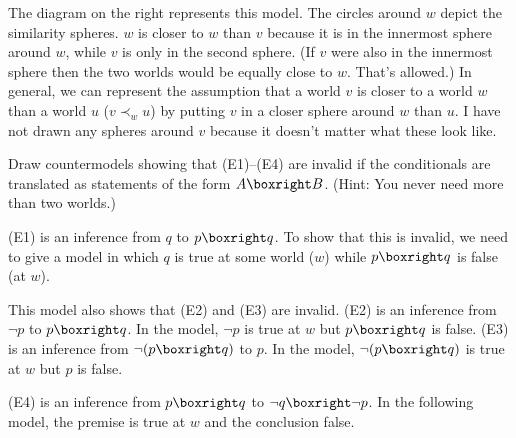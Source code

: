 The diagram on the right represents this model. The circles around $w$ depict
the similarity spheres. $w$ is closer to $w$ than $v$ because it is in the
innermost sphere around $w$, while $v$ is only in the second sphere. (If $v$
were also in the innermost sphere then the two worlds would be equally close to
$w$. That's allowed.) In general, we can represent the assumption that a world $v$
is closer to a world $w$ than a world $u$ ($v \prec_w u$) by putting $v$  in a
closer sphere around $w$ than $u$. I have not drawn any spheres around $v$
because it doesn't matter what these look like.


\begin{exercise}
  Draw countermodels showing that (E1)--(E4) are invalid if the conditionals are
  translated as statements of the form $A \boxright B$. (Hint: You never need
  more than two worlds.)
\end{exercise}
\begin{solution}
    (E1) is an inference from $q$ to $p \boxright q$. To show that this is invalid, we need to give a model in which $q$ is true at some world ($w$) while $p \boxright q$ is false (at $w$). 
    
  
  This model also shows that (E2) and (E3) are invalid.
  (E2) is an inference from $\neg p$ to $p \boxright q$. In the model,
  $\neg p$ is true at $w$ but $p \boxright q$ is false.
  (E3) is an inference from $\neg(p \boxright q)$ to $p$. In the model,
  $\neg(p \boxright q)$ is true at $w$ but $p$ is false.

  (E4) is an inference from $p \boxright q$ to $\neg q \boxright \neg p$.
  In the following model, the premise is true at $w$ and the conclusion false.
  
\end{solution}

